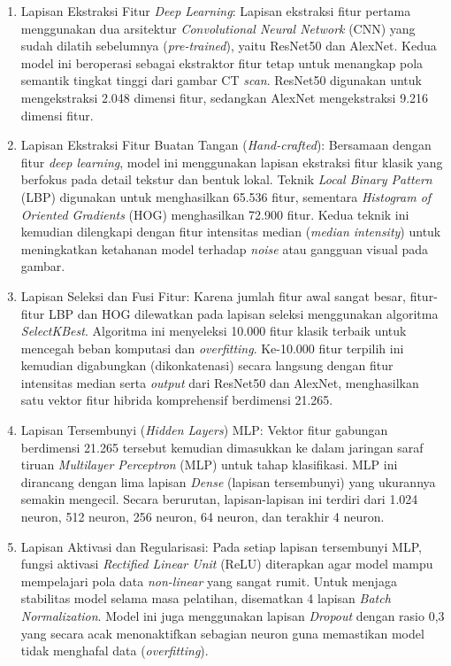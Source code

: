 \begin{enumerate}
	\item Lapisan Ekstraksi Fitur \textit{Deep Learning}:
	Lapisan ekstraksi fitur pertama menggunakan dua arsitektur \textit{Convolutional Neural Network} (CNN) yang sudah dilatih sebelumnya (\textit{pre-trained}), yaitu ResNet50 dan AlexNet. Kedua model ini beroperasi sebagai ekstraktor fitur tetap untuk menangkap pola semantik tingkat tinggi dari gambar CT \textit{scan}. ResNet50 digunakan untuk mengekstraksi 2.048 dimensi fitur, sedangkan AlexNet mengekstraksi 9.216 dimensi fitur.
	
	\item Lapisan Ekstraksi Fitur Buatan Tangan (\textit{Hand-crafted}):
	Bersamaan dengan fitur \textit{deep learning}, model ini menggunakan lapisan ekstraksi fitur klasik yang berfokus pada detail tekstur dan bentuk lokal. Teknik \textit{Local Binary Pattern} (LBP) digunakan untuk menghasilkan 65.536 fitur, sementara \textit{Histogram of Oriented Gradients} (HOG) menghasilkan 72.900 fitur. Kedua teknik ini kemudian dilengkapi dengan fitur intensitas median (\textit{median intensity}) untuk meningkatkan ketahanan model terhadap \textit{noise} atau gangguan visual pada gambar.
	
	\item Lapisan Seleksi dan Fusi Fitur:
	Karena jumlah fitur awal sangat besar, fitur-fitur LBP dan HOG dilewatkan pada lapisan seleksi menggunakan algoritma \textit{SelectKBest}. Algoritma ini menyeleksi 10.000 fitur klasik terbaik untuk mencegah beban komputasi dan \textit{overfitting}. Ke-10.000 fitur terpilih ini kemudian digabungkan (dikonkatenasi) secara langsung dengan fitur intensitas median serta \textit{output} dari ResNet50 dan AlexNet, menghasilkan satu vektor fitur hibrida komprehensif berdimensi 21.265.
	
	\item Lapisan Tersembunyi (\textit{Hidden Layers}) MLP:
	Vektor fitur gabungan berdimensi 21.265 tersebut kemudian dimasukkan ke dalam jaringan saraf tiruan \textit{Multilayer Perceptron} (MLP) untuk tahap klasifikasi. MLP ini dirancang dengan lima lapisan \textit{Dense} (lapisan tersembunyi) yang ukurannya semakin mengecil. Secara berurutan, lapisan-lapisan ini terdiri dari 1.024 neuron, 512 neuron, 256 neuron, 64 neuron, dan terakhir 4 neuron.
	
	\item Lapisan Aktivasi dan Regularisasi:
	Pada setiap lapisan tersembunyi MLP, fungsi aktivasi \textit{Rectified Linear Unit} (ReLU) diterapkan agar model mampu mempelajari pola data \textit{non-linear} yang sangat rumit. Untuk menjaga stabilitas model selama masa pelatihan, disematkan 4 lapisan \textit{Batch Normalization}. Model ini juga menggunakan lapisan \textit{Dropout} dengan rasio 0,3 yang secara acak menonaktifkan sebagian neuron guna memastikan model tidak menghafal data (\textit{overfitting}).
	

\end{enumerate}
